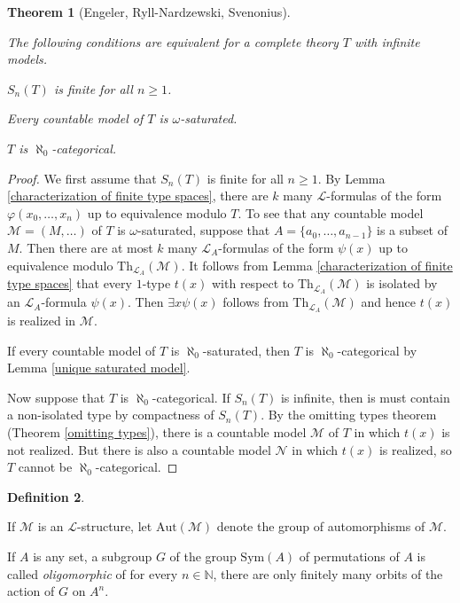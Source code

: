 \documentclass[10pt]{amsart}
\renewcommand{\L}{\mathcal{L}}
\newcommand{\NNN}{\mathbb{N}}
\newcommand{\MM}{\mathcal{M}}
\newcommand{\NN}{\mathcal{N}}
\newcommand{\Th}{\mathrm{Th}}
\newcommand{\Aut}{\mathrm{Aut}}
\newcommand{\Sym}{\mathrm{Sym}}
\newtheorem{theorem}{Theorem}[subsection]
\theoremstyle{definition}
\newtheorem{definition}[theorem]{Definition}
\theoremstyle{remark}
\newenvironment{enumerate-(a)}{\begin{enumerate}[label={\upshape (\alph*)}, leftmargin=2pc]}{\end{enumerate}}
\begin{document}
\begin{theorem} [Engeler, Ryll-Nardzewski, Svenonius] \label{Ryll-Nardzewski}

The following conditions are equivalent for a complete theory $T$ with infinite models. 
\begin{enumerate-(a)} 
\item 
$S_n(T)$ is finite for all $n\geq 1$. 
\item 
Every countable model of $T$ is $\omega$-saturated. 
\item 
$T$ is $\aleph_0$-categorical. 
\end{enumerate-(a)} 
\end{theorem} 
\begin{proof} 
We first assume that $S_n(T)$ is finite for all $n\geq 1$. By Lemma \ref{characterization of finite type spaces}, there are $k$ many $\L$-formulas of the form $\varphi(x_0,\dots,x_n)$ up to equivalence modulo $T$. To see that any countable model $\MM=(M,\dots)$ of $T$ is $\omega$-saturated, suppose that $A=\{a_0,\dots,a_{n-1}\}$ is a subset of $M$. Then there are at most $k$ many $\L_A$-formulas of the form $\psi(x)$ up to equivalence modulo $\Th_{\L_A}(\MM)$. It follows from Lemma \ref{characterization of finite type spaces} that every $1$-type $t(x)$ with respect to $\Th_{\L_A}(\MM)$ is isolated by an $\L_A$-formula $\psi(x)$. Then $\exists x \psi(x)$ follows from $\Th_{\L_A}(\MM)$ and hence $t(x)$ is realized in $\MM$.  

If every countable model of $T$ is $\aleph_0$-saturated, then $T$ is $\aleph_0$-categorical by Lemma \ref{unique saturated model}. 

Now suppose that $T$ is $\aleph_0$-categorical. 
If $S_n(T)$ is infinite, then is must contain a non-isolated type by compactness of $S_n(T)$. 
By the omitting types theorem (Theorem \ref{omitting types}), there is a countable model $\MM$ of $T$ in which $t(x)$ is not realized. But there is also a countable model $\NN$ in which $t(x)$ is realized, so $T$ cannot be $\aleph_0$-categorical. 
\end{proof} 

\begin{definition} 
\begin{enumerate-(a)} 
\item 
If $\MM$ is an $\L$-structure, let $\Aut(\MM)$ denote the group of automorphisms of $\MM$. 
\item 
If $A$ is any set, a subgroup $G$ of the group $\Sym(A)$ of permutations of $A$ is called \emph{oligomorphic} of for every $n\in\NNN$, there are only finitely many orbits of the action of $G$ on $A^n$. 
\end{enumerate-(a)} 
\end{definition} 
\end{document}
